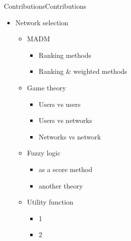 \begin{frame}{Contributions}{Contributions}

\begin{itemize}
	\item Network selection
	\begin{itemize}
		\item MADM
		\begin{itemize}
			\item Ranking methods
			\item Ranking \& weighted methods
		\end{itemize}
		\item Game theory
		\begin{itemize}
			\item Users vs users
			\item Users vs networks
			\item Networks vs network
		\end{itemize}
		\item Fuzzy logic
		\begin{itemize}
			\item as a score method
			\item another theory
		\end{itemize}
		\item Utility function
		\begin{itemize}
			\item 1
			\item 2
		\end{itemize}
	\end{itemize}
\end{itemize}


\end{frame}